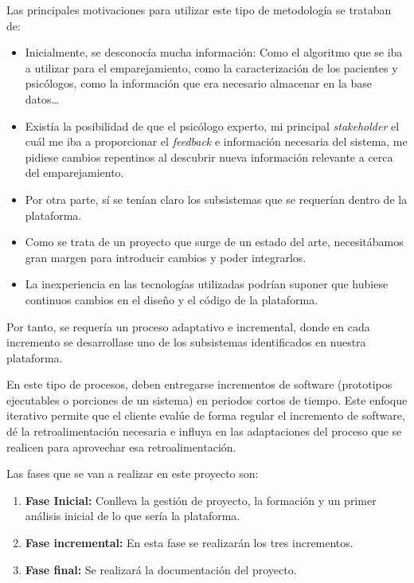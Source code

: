 Las principales motivaciones para utilizar este tipo de metodología se trataban de:

\begin{itemize}
\item Inicialmente, se desconocía mucha información: Como el algoritmo que se iba a utilizar para el emparejamiento, como la caracterización de los pacientes y psicólogos, como la información que era necesario almacenar en la base datos\dots
\item Existía la posibilidad de que el psicólogo experto, mi principal \textit{stakeholder} el cuál me iba a proporcionar el \textit{feedback} e información necesaria del sistema, me pidiese cambios repentinos al descubrir nueva información relevante a cerca del emparejamiento.
\item Por otra parte, sí se tenían claro los subsistemas que se requerían dentro de la plataforma.
\item Como se trata de un proyecto que surge de un estado del arte, necesitábamos gran margen para introducir cambios y poder integrarlos.
\item La inexperiencia en las tecnologías utilizadas podrían suponer que hubiese continuos cambios en el diseño y el código de la plataforma.
\end{itemize}


Por tanto, se requería un proceso adaptativo e incremental, donde en cada incremento se desarrollase uno de los subsistemas identificados en nuestra plataforma.


En este tipo de procesos, deben entregarse incrementos de software (prototipos ejecutables o porciones de un sistema) en periodos cortos de tiempo. Este enfoque iterativo permite que el cliente evalúe de forma regular el incremento de software, dé la retroalimentación necesaria e influya en las adaptaciones del proceso que se realicen para aprovechar esa retroalimentación.


Las fases que se van a realizar en este proyecto son:
\begin{enumerate}
\item \textbf{Fase Inicial:} Conlleva la gestión de proyecto, la formación y un primer análisis inicial de lo que sería la plataforma.
\item \textbf{Fase incremental:} En esta fase se realizarán los tres incrementos.
\item \textbf{Fase final:} Se realizará la documentación del proyecto.
\end{enumerate}

